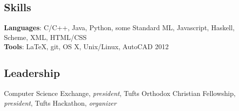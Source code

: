 \documentclass{article}
\newcommand{\skillNS}[2]{
  \textbf{#1}: #2
}
\begin{document}
\subsection*{Skills}
  \skillNS{Languages} {C/C++, Java, Python, some Standard ML, Javascript,
                      Haskell, Scheme, XML, HTML/CSS}\\
  \skillNS{Tools}     {LaTeX, git, OS X, Unix/Linux, AutoCAD 2012} \\

\subsection*{Leadership}
  Computer Science Exchange, \textit{president}, Tufts Orthodox
  Christian Fellowship, \textit{president}, Tufts Hackathon,
  \textit{organizer}
\end{document}
